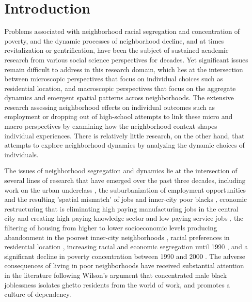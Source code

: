 \documentclass[12pt,a4paper]{article}
\begin{document}
\section{Introduction}
Problems associated with neighborhood racial segregation and
concentration of poverty, and the dynamic processes of neighborhood
decline, and at times revitalization or gentrification, have been
the subject of sustained academic research from various social
science perspectives for decades. Yet significant issues remain
difficult to address in this research domain, which lies at the
intersection between microscopic perspectives that focus on
individual choices such as residential location, and macroscopic
perspectives that focus on the aggregate dynamics and emergent
spatial patterns across neighborhoods.  The extensive research
assessing neighborhood effects on individual outcomes such as
employment or dropping out of high-school attempts to link these
micro and macro perspectives by examining how the neighborhood
context shapes individual experiences.  There is relatively little
research, on the other hand, that attempts to explore neighborhood
dynamics by analyzing the dynamic choices of individuals.

The issues of neighborhood segregation and dynamics lie at the
intersection of several lines of research that have emerged over the
past three decades, including work on the urban underclass
\cite{wilson-book-1987}, the suburbanization of employment
opportunities and the resulting 'spatial mismatch' of jobs and
inner-city poor blacks \cite{kain-qje-1968}, economic restructuring
that is eliminating high paying manufacturing jobs in the central
city and creating high paying knowledge sector and low paying
service jobs \cite{kasarda-1985}, the filtering of housing from
higher to lower socioeconomic levels producing abandonment in the
poorest inner-city neighborhoods \cite{stegman-aereuea-1977}, racial
preferences in residential location \cite{clark-demography-1992},
increasing racial and economic segregation until 1990
\cite{jargowsky-asr-1996,jargowsky-book-1997,massey-ajs-1990}, and a
significant decline in poverty concentration between 1990 and 2000
\cite{jargowsky-brookings-2003}. The adverse consequences of living
in poor neighborhoods have received substantial attention in the
literature following Wilson's \cite{wilson-book-1987} argument that
concentrated male black joblessness isolates ghetto residents from
the world of work, and promotes a culture of dependency.
\end{document}
